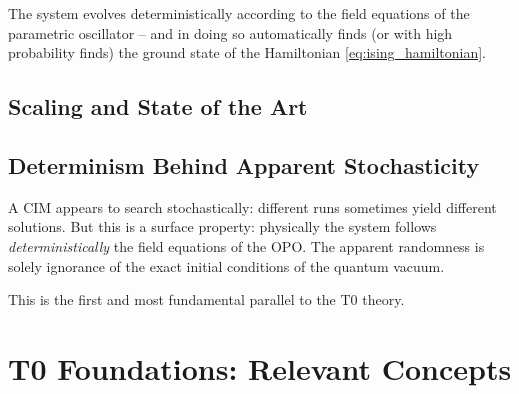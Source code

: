 The system evolves deterministically according to the field equations of the
parametric oscillator -- and in doing so automatically finds (or with high probability
finds) the ground state of the Hamiltonian \eqref{eq:ising_hamiltonian}.

\subsection{Scaling and State of the Art}

\begin{table}[h]
    \centering
    \caption{Comparison: Classical computer vs.\ Coherent Ising Machine}
    \label{tab:cim_vs_classical}
\end{table}

\subsection{Determinism Behind Apparent Stochasticity}
\label{subsec:cim_determinism}

A CIM appears to search stochastically: different runs sometimes yield different
solutions. But this is a surface property: physically the system follows
\emph{deterministically} the field equations of the OPO. The apparent randomness
is solely ignorance of the exact initial conditions of the quantum vacuum.

This is the first and most fundamental parallel to the T0 theory.

\clearpage

\section{T0 Foundations: Relevant Concepts}
\label{sec:t0}


